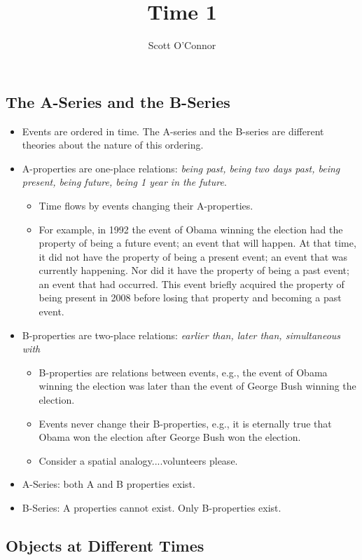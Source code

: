 \documentclass[]{article}
\title{Time 1}
\author{Scott O’Connor}
\begin{document}
\maketitle
 

\subsection*{The A-Series and the B-Series}

\begin{itemize}
\item Events are ordered in time. The A-series and the B-series are different theories about the nature of this ordering. 
\item A-properties are one-place relations: \emph{being past, being two days past, being present, being future, being 1 year in the future}.
\begin{itemize}
\item Time flows by events changing their A-properties. 
\item For example, in 1992 the event of Obama winning the election had the property of being a future event; an event that will happen. At that time, it did not have the property of being a present event; an event that was currently happening. Nor did it have the property of being a past event; an event that had occurred. This event briefly acquired the property of being present in 2008 before losing that property and becoming a past event. 
\end{itemize}
\item B-properties are two-place relations: \emph{earlier than, later than, simultaneous with}
\begin{itemize}
\item B-properties are relations between events, e.g., the event of Obama winning the election was later than the event of George Bush winning the election.
\item Events never change their B-properties, e.g., it is eternally true that Obama won the election after George Bush won the election.
\item Consider a spatial analogy....volunteers please.
\end{itemize}
\item A-Series: both A and B properties exist. 
\item B-Series: A properties cannot exist. Only B-properties exist. 
\end{itemize}

\subsection*{Objects at Different Times}
\end{document}
